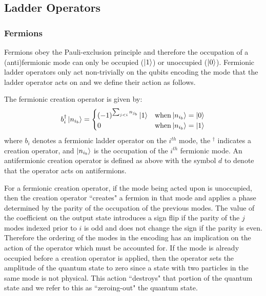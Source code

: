 
\subsection{Ladder Operators}
\label{subsec:operators}

\subsubsection{Fermions}

Fermions obey the Pauli-exclusion principle \cite{pauli1925zusammenhang} and therefore the occupation of a (anti)fermionic mode can only be occupied ($\ket{1}$) or unoccupied ($\ket{0}$).
Fermionic ladder operators only act non-trivially on the qubits encoding the mode that the ladder operator acts on and we define their action as follows.

The fermionic creation operator is given by:
\begin{equation}
    \label{eq:fermionic-creation}
    b_i^\dagger \ket{n_{i_b}} = 
    \begin{cases} 
        (-1)^{\sum_{j < i} n_{j_b}} \ket{1}  & {\rm when} \ket{n_{i_b}} = \ket{0} \\
        0 & {\rm when} \ket{n_{i_b}} = \ket{1}
    \end{cases}
\end{equation}
where $b_i$ denotes a fermionic ladder operator on the $i^{th}$ mode, the $^\dagger$ indicates a creation operator, and $\ket{n_{i_b}}$ is the occupation of the $i^{th}$ fermionic mode.
An antifermionic creation operator is defined as above with the symbol $d$ to denote that the operator acts on antifermions.

For a fermionic creation operator, if the mode being acted upon is unoccupied, then the creation operator ``creates" a fermion in that mode and applies a phase determined by the parity of the occupation of the previous modes.
The value of the coefficient on the output state introduces a sign flip if the parity of the $j$ modes indexed prior to $i$ is odd and does not change the sign if the parity is even. 
Therefore the ordering of the modes in the encoding has an implication on the action of the operator which must be accounted for.
If the mode is already occupied before a creation operator is applied, then the operator sets the amplitude of the quantum state to zero since a state with two particles in the same mode is not physical.
This action ``destroys" that portion of the quantum state and we refer to this as ``zeroing-out" the quantum state. 

